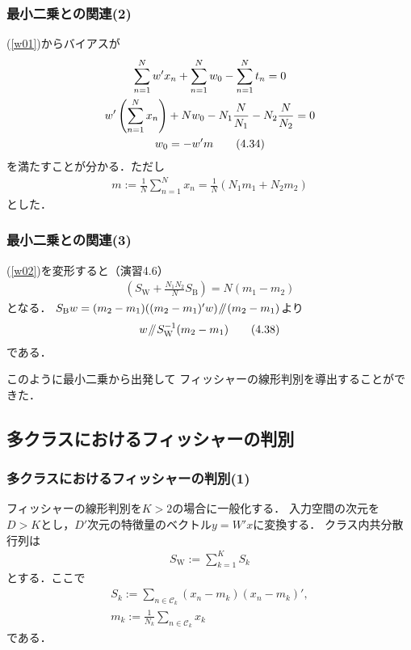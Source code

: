 \documentclass[10pt,%
hyperref={unicode}]{beamer}
\newcommand{\parallelsl}{\mathbin{\!/\mkern-5mu/\!}}
\newcommand{\braref}[1]{{\fontfamily{cmr}\selectfont (\ref{#1})}}
\begin{document}
\begin{frame}
    \frametitle{最小二乗との関連(2)}
    \braref{w01}からバイアスが
    \begin{gather}
        \sum_{n = 1}^N w'x_n + \sum_{n = 1}^N w_0 - \sum_{n = 1}^N t_n = 0 \notag \\
        w'\left(\sum_{n = 1}^N x_n\right)
        + N w_0 - N_1\frac{N}{N_1} - N_2 \frac{N}{N_2} = 0 \notag \\
        w_0 = - w'm \tag{4.34}
    \end{gather}
    を満たすことが分かる．ただし
    \begin{align}
        m := \frac{1}{N} \sum_{n = 1}^N x_n = \frac{1}{N}(N_1 m_1 + N_2 m_2) \tag{4.36}
    \end{align}
    とした．
\end{frame}

\begin{frame}
    \frametitle{最小二乗との関連(3)}
    \braref{w02}を変形すると（演習4.6）
    \begin{align*}
        \left(S_\mathrm{W} + \frac{N_1 N_2}{N}S_\mathrm{B} \right)
        = N (m_1 - m_2) \tag{4.37}
    \end{align*}
    となる．
    $S_\mathrm{B}w = (m_2 - m_1)((m_2 - m_1)'w) \parallelsl (m_2 - m_1)$より
    \begin{align}
        w \parallelsl S_\mathrm{W}^{-1}(m_2 - m_1) \tag{4.38}
    \end{align}
    である．

    \bigskip

    このように最小二乗から出発して
    フィッシャーの線形判別を導出することができた．

\end{frame}

\subsection{多クラスにおけるフィッシャーの判別}
\begin{frame}
    \frametitle{多クラスにおけるフィッシャーの判別(1)}
    フィッシャーの線形判別を$K > 2$の場合に一般化する．
    入力空間の次元を$D > K$とし，$D'$次元の特徴量のベクトル$y = W'x$に変換する．
    クラス内共分散行列は
    \begin{align}
        S_\mathrm{W} := \sum_{k = 1}^K S_k \tag{4.40}
    \end{align}
    とする．ここで
    \begin{gather}
        S_k := \sum_{n \in \mathcal{C}_k}(x_n - m_k)(x_n - m_k)', \tag{4.41} \\
        m_k := \frac{1}{N_k}\sum_{n \in \mathcal{C}_k} x_k \tag{4.42}
    \end{gather}
    である．
\end{frame}
\end{document}
